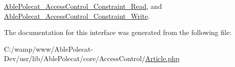 \hyperlink{class_able_polecat___access_control___constraint___read_ad9ade868bd136d32967059d1cccb3e92}{Able\+Polecat\+\_\+\+Access\+Control\+\_\+\+Constraint\+\_\+\+Read}, and \hyperlink{class_able_polecat___access_control___constraint___write_ad9ade868bd136d32967059d1cccb3e92}{Able\+Polecat\+\_\+\+Access\+Control\+\_\+\+Constraint\+\_\+\+Write}.



The documentation for this interface was generated from the following file\+:\begin{DoxyCompactItemize}
\item 
C\+:/wamp/www/\+Able\+Polecat-\/\+Dev/usr/lib/\+Able\+Polecat/core/\+Access\+Control/\hyperlink{_article_8php}{Article.\+php}\end{DoxyCompactItemize}
